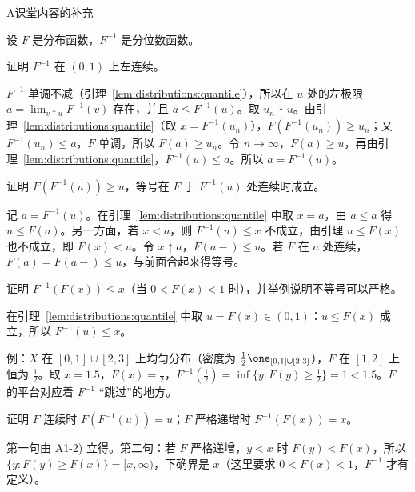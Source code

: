 \begin{exercises}{A}{课堂内容的补充}
\item\label{ex:distributions:A1} 设 $F$ 是分布函数，$F^{-1}$ 是分位数函数。
\begin{questions}
\item 证明 $F^{-1}$ 在 $(0,1)$ 上左连续。
\begin{solution}
$F^{-1}$ 单调不减（引理~\ref{lem:distributions:quantile}），所以在 $u$ 处的左极限 $a=\lim_{v\uparrow u}F^{-1}(v)$ 存在，并且 $a\leqslant F^{-1}(u)$。取 $u_n\uparrow u$。由引理~\ref{lem:distributions:quantile}（取 $x=F^{-1}(u_n)$），$F(F^{-1}(u_n))\geqslant u_n$；又 $F^{-1}(u_n)\leqslant a$，$F$ 单调，所以 $F(a)\geqslant u_n$。令 $n\to\infty$，$F(a)\geqslant u$，再由引理~\ref{lem:distributions:quantile}，$F^{-1}(u)\leqslant a$。所以 $a=F^{-1}(u)$。
\end{solution}
\item 证明 $F(F^{-1}(u))\geqslant u$，等号在 $F$ 于 $F^{-1}(u)$ 处连续时成立。
\begin{solution}
记 $a=F^{-1}(u)$。在引理~\ref{lem:distributions:quantile} 中取 $x=a$，由 $a\leqslant a$ 得 $u\leqslant F(a)$。另一方面，若 $x<a$，则 $F^{-1}(u)\leqslant x$ 不成立，由引理 $u\leqslant F(x)$ 也不成立，即 $F(x)<u$。令 $x\uparrow a$，$F(a-)\leqslant u$。若 $F$ 在 $a$ 处连续，$F(a)=F(a-)\leqslant u$，与前面合起来得等号。
\end{solution}
\item 证明 $F^{-1}(F(x))\leqslant x$（当 $0<F(x)<1$ 时），并举例说明不等号可以严格。
\begin{solution}
在引理~\ref{lem:distributions:quantile} 中取 $u=F(x)\in(0,1)$：$u\leqslant F(x)$ 成立，所以 $F^{-1}(u)\leqslant x$。

例：$X$ 在 $[0,1]\cup[2,3]$ 上均匀分布（密度为 $\frac12\one_{[0,1]\cup[2,3]}$），$F$ 在 $[1,2]$ 上恒为 $\frac12$。取 $x=1.5$，$F(x)=\frac12$，$F^{-1}(\frac12)=\inf\{y:F(y)\geqslant\frac12\}=1<1.5$。$F$ 的平台对应着 $F^{-1}$ “跳过”的地方。
\end{solution}
\item 证明 $F$ 连续时 $F(F^{-1}(u))=u$；$F$ 严格递增时 $F^{-1}(F(x))=x$。
\begin{solution}
第一句由 A1-2) 立得。第二句：若 $F$ 严格递增，$y<x$ 时 $F(y)<F(x)$，所以 $\{y:F(y)\geqslant F(x)\}=[x,\infty)$，下确界是 $x$（这里要求 $0<F(x)<1$，$F^{-1}$ 才有定义）。
\end{solution}
\end{questions}


\end{exercises}
